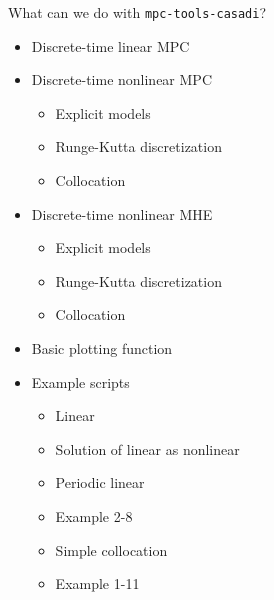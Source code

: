 \documentclass[xcolor=dvipsnames]{beamer}
\begin{document}
\begin{frame}{What can we do with \texttt{mpc-tools-casadi}?}
    \begin{itemize}
        \item Discrete-time linear MPC
        \item Discrete-time nonlinear MPC
        \begin{itemize}
            \item Explicit models
            \item Runge-Kutta discretization
            \item Collocation
        \end{itemize}
        \item Discrete-time nonlinear MHE
        \begin{itemize}
            \item Explicit models
            \item Runge-Kutta discretization
            \item Collocation
        \end{itemize}
        \item Basic plotting function
        \item Example scripts
        \begin{itemize}
            \item Linear
            \item Solution of linear as nonlinear
            \item Periodic linear
            \item Example 2-8
            \item Simple collocation
            \item Example 1-11
        \end{itemize}
    \end{itemize}
    
\end{frame}
\end{document}
